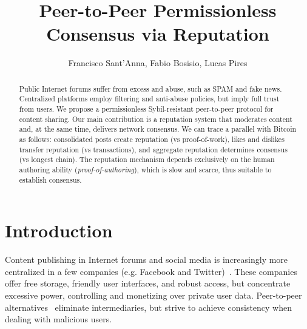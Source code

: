 \documentclass[12pt]{article}
\title{
    Peer-to-Peer Permissionless Consensus via Reputation
}
\author {
    Francisco Sant'Anna,
    Fabio Bosisio,
    Lucas Pires
}
\begin{document}
\maketitle

\begin{abstract}
Public Internet forums suffer from excess and abuse, such as SPAM and fake
news.
Centralized platforms employ filtering and anti-abuse policies, but imply full
trust from users.
%
We propose a permissionless Sybil-resistant peer-to-peer protocol for content
sharing.
Our main contribution is a reputation system that moderates content and, at the
same time, delivers network consensus.
We can trace a parallel with Bitcoin as follows:
    consolidated posts create reputation (vs proof-of-work),
    likes and dislikes transfer reputation (vs transactions), and
    aggregate reputation determines consensus (vs longest chain).
%
The reputation mechanism depends exclusively on the human authoring ability
(\emph{proof-of-authoring}), which is slow and scarce, thus suitable to
establish consensus.
\end{abstract}

\section{Introduction}
\label{sec.introduction}

Content publishing in Internet forums and social media is
increasingly more centralized in a few companies (e.g. Facebook and
Twitter)~\cite{internet.fixing}.
These companies offer free storage, friendly user interfaces, and robust access,
but concentrate excessive power, controlling and monetizing over private user data.
%
Peer-to-peer alternatives~\cite{p2p.survey} eliminate intermediaries, but
strive to achieve consistency when dealing with malicious users.
\end{document}
